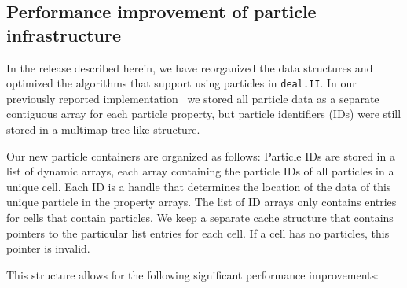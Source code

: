 \documentclass{ansarticle-preprint}
\newcommand{\specialword}[1]{\texttt{#1}}
\newcommand{\dealii}{{\specialword{deal.II}}\xspace}
\begin{document}



\subsection{Performance improvement of particle infrastructure}\label{sec:particles}

In the release described herein, we have reorganized the data
structures and optimized the algorithms that support using particles
in \dealii. In our previously reported implementation~\citep{dealII93} we stored all particle data as a separate contiguous array for each particle property, but particle identifiers (IDs) were still stored in a multimap tree-like structure.

Our new particle containers are organized as follows: Particle IDs are stored in a list of dynamic arrays, each array containing the particle IDs of all particles in a unique cell. Each ID is a handle that determines the location of the data of this unique particle in the property arrays.
The list of ID arrays only contains entries for cells that contain particles. We keep a separate cache structure that contains pointers to the particular list entries for each cell. If a cell has no particles, this pointer is invalid.

This structure allows for the following significant performance improvements:
\end{document}
